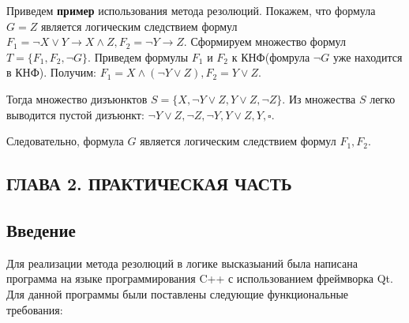 \documentclass[12pt, a4paper]{article}
\begin{document}
	 \par Приведем \textbf{пример} использования метода резолюций. Покажем, что формула $G = Z$ является логическим следствием формул $F_{1} = \neg X \lor Y \rightarrow X \land Z, F_{2} = \neg Y \rightarrow Z$. Сформируем множество формул $T = \{F_{1}, F_{2}, \neg G \}$. Приведем формулы $F_{1}$ и $F_{2}$ к КНФ(фомрула $\neg G$ уже находится в КНФ). Получим: $F_{1} = X \land (\neg Y \lor Z), F_{2} = Y \lor Z$. 
	 \par  Тогда множество дизъюнктов $S = \{X, \neg Y \lor Z, Y \lor Z, \neg Z \}$. Из множества $S$ легко выводится пустой дизъюнкт: $\neg Y \lor Z, \neg Z, \neg Y, Y \lor Z, Y, \square$.
	 \par Следовательно, формула $G$ является логическим следствием формул $F_{1}, F_{2}$.
	 
	 \newpage
	 \begin{center}
	 	\section*{ГЛАВА 2. ПРАКТИЧЕСКАЯ ЧАСТЬ}
	 \end{center}
	 \setcounter{section}{2}
	 \setcounter{subsection}{0}
	 \begin{center}
	 	\subsection{Введение}
	 \end{center} 
	 \par Для реализации метода резолюций в логике высказыаний была написана программа на языке программирования C++ с использованием фреймворка Qt. Для данной программы были поставлены следующие функциональные требования:
\end{document}
